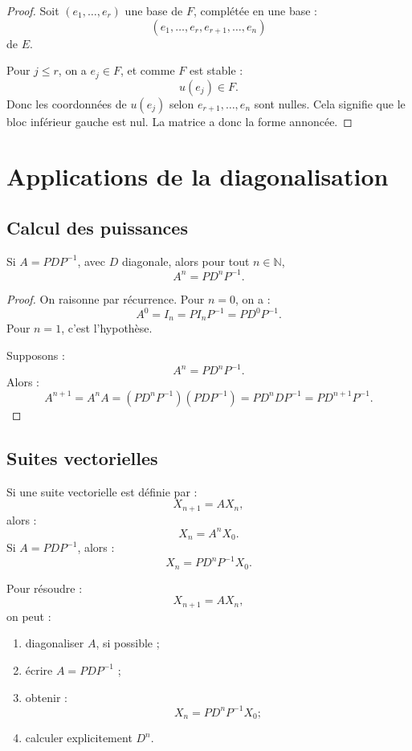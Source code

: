 \documentclass[11pt,a4paper]{article}
\newcommand{\N}{\mathbb N}
\begin{document}
\begin{proof}
Soit \((e_1,\dots,e_r)\) une base de \(F\), complétée en une base :
\[
(e_1,\dots,e_r,e_{r+1},\dots,e_n)
\]
de \(E\).

Pour \(j\leq r\), on a \(e_j\in F\), et comme \(F\) est stable :
\[
u(e_j)\in F.
\]
Donc les coordonnées de \(u(e_j)\) selon \(e_{r+1},\dots,e_n\) sont nulles.  
Cela signifie que le bloc inférieur gauche est nul.  
La matrice a donc la forme annoncée.
\end{proof}

\section{Applications de la diagonalisation}

\subsection{Calcul des puissances}

\begin{theorembox}
Si \(A=PDP^{-1}\), avec \(D\) diagonale, alors pour tout \(n\in\N\),
\[
A^n=PD^nP^{-1}.
\]
\end{theorembox}

\begin{proof}
On raisonne par récurrence.  
Pour \(n=0\), on a :
\[
A^0=I_n=P I_n P^{-1}=PD^0P^{-1}.
\]
Pour \(n=1\), c'est l'hypothèse.

Supposons :
\[
A^n=PD^nP^{-1}.
\]
Alors :
\[
A^{n+1}=A^nA
=
(PD^nP^{-1})(PDP^{-1})
=
PD^nDP^{-1}
=
PD^{n+1}P^{-1}.
\]
\end{proof}

\subsection{Suites vectorielles}

Si une suite vectorielle est définie par :
\[
X_{n+1}=AX_n,
\]
alors :
\[
X_n=A^nX_0.
\]
Si \(A=PDP^{-1}\), alors :
\[
X_n=PD^nP^{-1}X_0.
\]

\begin{methodbox}
Pour résoudre :
\[
X_{n+1}=AX_n,
\]
on peut :
\begin{enumerate}
    \item diagonaliser \(A\), si possible ;
    \item écrire \(A=PDP^{-1}\) ;
    \item obtenir :
    \[
    X_n=PD^nP^{-1}X_0 ;
    \]
    \item calculer explicitement \(D^n\).
\end{enumerate}
\end{methodbox}
\end{document}
